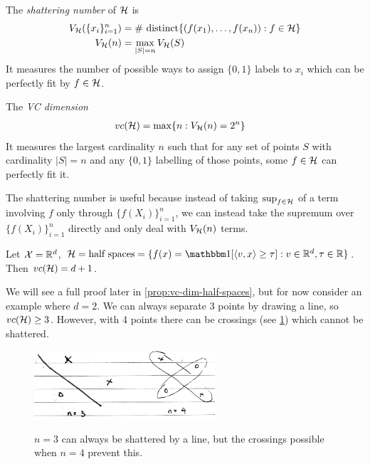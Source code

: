 \begin{definition}
    The \emph{shattering number} of $\mathcal{H}$ is
    \begin{align}
        V_{\mathcal{H}}(\{x_i\}_{i=1}^n) &= \text{\# distinct} \{(f(x_1), \ldots, f(x_n)) : f \in \mathcal{H}\} \\
        V_{\mathcal{H}}(n) &= \max_{\lvert S \rvert = n} V_{\mathcal{H}}(S)
    \end{align}
    It measures the number of possible ways to assign $\{0,1\}$ labels to $x_i$ which can be perfectly
    fit by $f \in \mathcal{H}$.

    The \emph{VC dimension}
    \begin{align}
        vc(\mathcal{H}) &= \max\{ n : V_{\mathcal{H}}(n) = 2^n\}\label{eq:vc-dim-def}
    \end{align}
    It measures the largest cardinality $n$ such that for any set of points $S$ with cardinality $\lvert S \rvert = n$
    and any $\{0,1\}$ labelling of those points, some $f \in \mathcal{H}$ can perfectly fit it.
\end{definition}

The shattering number is useful because instead of taking $\sup_{f \in \mathcal{H}}$ of a term
involving $f$ only through $\{f(X_i)\}_{i=1}^n$, we can instead take the supremum over
$\{f(X_i)\}_{i=1}^n$ directly and only deal with $V_{\mathcal{H}}(n)$ terms.

\begin{example}\label{eg:half-spaces-vc}
    Let $\mathcal{X} = \mathbb{R}^d$, $\cH = \text{half spaces} = \{f(x) = \ind[\braket{v,x} \geq \tau] : v \in \RR^d, \tau \in \RR \}$.
    Then $vc(\mathcal{H}) = d+1$.

    We will see a full proof later in \cref{prop:vc-dim-half-spaces}, but for
    now consider an example where $d=2$.
    We can always separate 3 points by drawing a line, so $vc(\mathcal{H}) \geq 3$.
    However, with 4 points there can be crossings (see \cref{fig:9-10-vc-hs})
    which cannot be shattered.
    \begin{figure}[H]
        \centering
        \includegraphics[width=0.6\textwidth]{figures/9-10-2.png}
        \label{fig:9-10-vc-hs}
        \caption{$n=3$ can always be shattered by a line, but the crossings possible when $n=4$ prevent this.}
    \end{figure}
\end{example}


